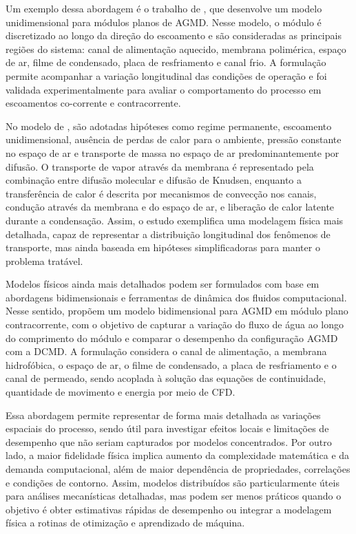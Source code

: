 Um exemplo dessa abordagem é o trabalho de \cite{Alsaadi2013}, que desenvolve um modelo unidimensional para módulos planos de AGMD. Nesse modelo, o módulo é discretizado ao longo da direção do escoamento e são consideradas as principais regiões do sistema: canal de alimentação aquecido, membrana polimérica, espaço de ar, filme de condensado, placa de resfriamento e canal frio. A formulação permite acompanhar a variação longitudinal das condições de operação e foi validada experimentalmente para avaliar o comportamento do processo em escoamentos co-corrente e contracorrente.

No modelo de \cite{Alsaadi2013}, são adotadas hipóteses como regime permanente, escoamento unidimensional, ausência de perdas de calor para o ambiente, pressão constante no espaço de ar e transporte de massa no espaço de ar predominantemente por difusão. O transporte de vapor através da membrana é representado pela combinação entre difusão molecular e difusão de Knudsen, enquanto a transferência de calor é descrita por mecanismos de convecção nos canais, condução através da membrana e do espaço de ar, e liberação de calor latente durante a condensação. Assim, o estudo exemplifica uma modelagem física mais detalhada, capaz de representar a distribuição longitudinal dos fenômenos de transporte, mas ainda baseada em hipóteses simplificadoras para manter o problema tratável.

Modelos físicos ainda mais detalhados podem ser formulados com base em abordagens bidimensionais e ferramentas de dinâmica dos fluidos computacional. Nesse sentido, \cite{Ansari2022} propõem um modelo bidimensional para AGMD em módulo plano contracorrente, com o objetivo de capturar a variação do fluxo de água ao longo do comprimento do módulo e comparar o desempenho da configuração AGMD com a DCMD. A formulação considera o canal de alimentação, a membrana hidrofóbica, o espaço de ar, o filme de condensado, a placa de resfriamento e o canal de permeado, sendo acoplada à solução das equações de continuidade, quantidade de movimento e energia por meio de CFD.

Essa abordagem permite representar de forma mais detalhada as variações espaciais do processo, sendo útil para investigar efeitos locais e limitações de desempenho que não seriam capturados por modelos concentrados. Por outro lado, a maior fidelidade física implica aumento da complexidade matemática e da demanda computacional, além de maior dependência de propriedades, correlações e condições de contorno. Assim, modelos distribuídos são particularmente úteis para análises mecanísticas detalhadas, mas podem ser menos práticos quando o objetivo é obter estimativas rápidas de desempenho ou integrar a modelagem física a rotinas de otimização e aprendizado de máquina.


